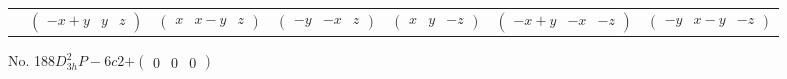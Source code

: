 \documentclass[fleqn,9pt,landscape]{jsarticle}
\begin{document}
\begin{center}
\begin{longtable}{ccccccc}
& $ \begin{pmatrix} - x + y & y & z \end{pmatrix} $ & $ \begin{pmatrix} x & x - y & z \end{pmatrix} $ & $ \begin{pmatrix} - y & - x & z \end{pmatrix} $ & $ \begin{pmatrix} x & y & - z \end{pmatrix} $ & $ \begin{pmatrix} - x + y & - x & - z \end{pmatrix} $ & $ \begin{pmatrix} - y & x - y & - z \end{pmatrix} $ \\
\end{longtable}
\end{center}
\newpage
No. 188\quad$D_{3h}^{2}$\quad$P-6c2$\quad[ hexagonal ]\quad$+\begin{pmatrix} 0 & 0 & 0 \end{pmatrix}$
\end{document}
